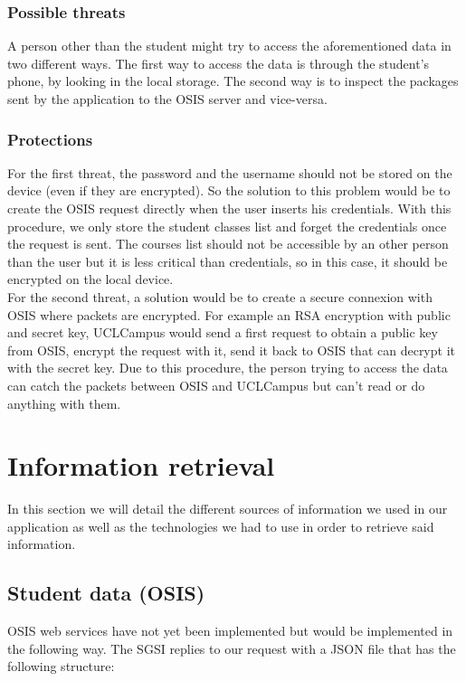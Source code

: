 \documentclass{eplmastersthesis}
\begin{document}
\subsubsection{Possible threats}
A person other than the student might try to access the aforementioned data in two different ways. The first way to access the data is through the student's phone, by looking in the local storage. The second way is to inspect the packages sent by the application to the OSIS server and vice-versa. 

\subsubsection{Protections}
For the first threat, the password and the username should not be stored on the device (even if they are encrypted). So the solution to this problem would be to create the OSIS request directly when the user inserts his credentials. With this procedure, we only store the student classes list and forget the credentials once the request is sent. The courses list should not be accessible by an other person than the user but it is less critical than credentials, so in this case, it should be encrypted on the local device. \\

For the second threat, a solution would be to create a secure connexion with OSIS where packets are encrypted. For example an RSA encryption with public and secret key, UCLCampus would send a first request to obtain a public key from OSIS, encrypt the request with it, send it back to OSIS that can decrypt it with the secret key. Due to this procedure, the person trying to access the data can catch the packets between OSIS and UCLCampus but can't read or do anything with them.
\section{Information retrieval}

In this section we will detail the different sources of information we used in our application as well as the technologies we had to use in order to retrieve said information. 
\subsection{Student data (OSIS)}

OSIS web services have not yet been implemented but would be implemented in the following way. The SGSI replies to our request with a JSON file that has the following structure:
\end{document}
